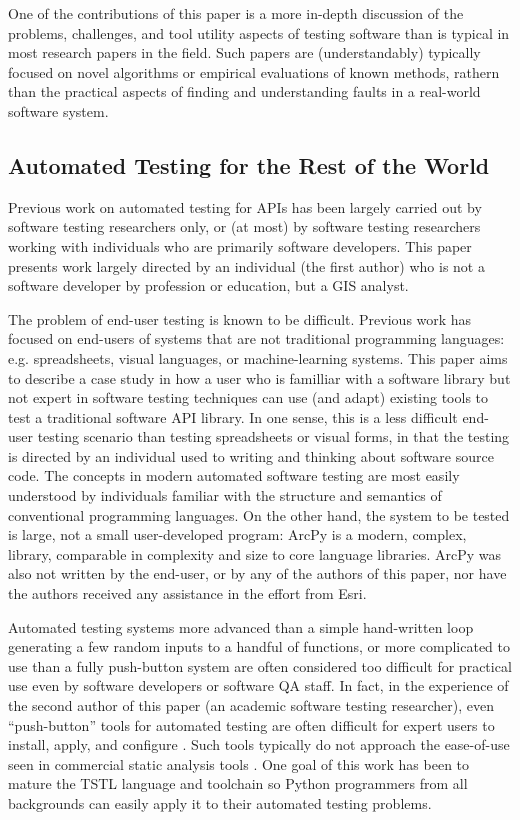 One of the contributions of this paper is a more in-depth discussion
of the problems, challenges, and tool utility aspects of testing
software than is typical in most research papers in the field.  Such
papers are (understandably) typically focused on novel algorithms or
empirical evaluations of known methods, rathern than the practical aspects of finding
and understanding faults in a real-world software system.


\subsection{Automated Testing for the Rest of the World}

Previous work on automated testing for APIs has been largely carried
out by software testing researchers only, or (at most) by software
testing researchers working with individuals who are primarily
software developers.  This paper presents work largely directed by an
individual (the first author) who is not a software developer by
profession or education, but a GIS analyst.  

The problem of end-user testing
\cite{burnettEUSE,Silos,rothermelTOSEM} is known to be difficult.
Previous work has focused on end-users of systems that are not
traditional programming languages: e.g. spreadsheets, visual
languages, or machine-learning systems.  This paper aims to describe a
case study in how a user who is familliar with a software library but
not expert in software testing techniques can use (and adapt) existing
tools to test a traditional software API library.  In one sense, this
is a less difficult end-user testing scenario than testing
spreadsheets or visual forms, in that the testing is directed by an
individual used to writing and thinking about software source code.
The concepts in modern automated software testing are most easily
understood by individuals familiar with the structure and semantics of
conventional programming languages.  On the other hand, the system to
be tested is large, not a small user-developed program: ArcPy is
a modern, complex, library, comparable in complexity and size to
core language libraries.   ArcPy was also not written by the end-user,
or by any of the authors of this paper, nor have the authors received
any  assistance in the effort from Esri.

Automated testing systems more advanced than a simple hand-written loop generating 
a few random inputs to a handful of functions, or more complicated to 
use than a fully push-button system are often considered too difficult 
for practical use even by software developers or software QA staff.
In fact, in the experience of the second author of this paper (an
academic software testing researcher), even ``push-button'' tools for
automated testing are often difficult for expert users to install, apply, and
configure \cite{AMAI,ISSRE}.  Such tools typically do not approach the ease-of-use seen
in commercial static analysis tools \cite{Coverity,Klocwork,CodeSonar}.  One goal of this work
has been to mature the TSTL language and toolchain so Python
programmers from all backgrounds can easily apply it to their
automated testing problems.


